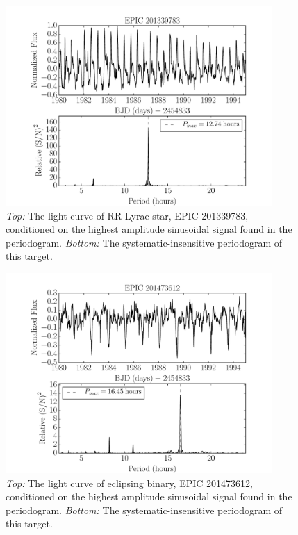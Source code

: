 \documentclass[useAMS, usenatbib]{aastex}
\begin{document}
\begin{figure}
\begin{center}
\includegraphics[width=4in, clip=true]{RR_201339783.pdf}
\caption{{\it Top:} The light curve of RR Lyrae star, EPIC 201339783,
	conditioned on the highest amplitude sinusoidal signal found in the
	periodogram. {\it Bottom:} The systematic-insensitive periodogram of
	this target.}
\label{fig:RRLyrae}
\end{center}
\end{figure}

\begin{figure}
\begin{center}
\includegraphics[width=4in, clip=true]{EB_201473612.pdf}
\caption{{\it Top:} The light curve of eclipsing binary, EPIC 201473612,
	conditioned on the highest amplitude sinusoidal signal found in the
	periodogram. {\it Bottom:} The systematic-insensitive periodogram of
	this target.}
\label{fig:EB}
\end{center}
\end{figure}
\end{document}
